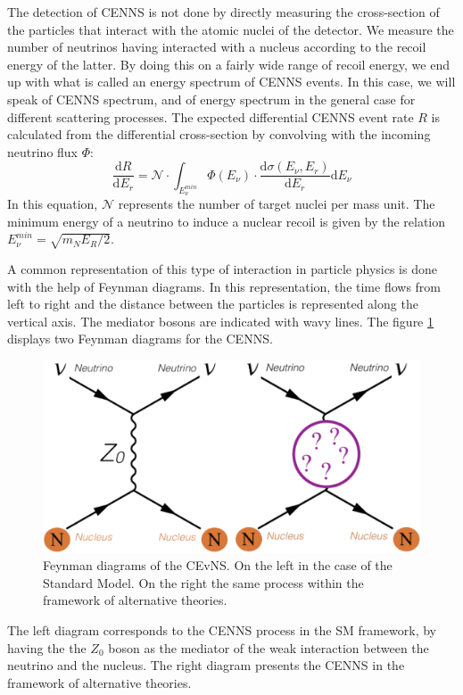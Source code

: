 The detection of CENNS is not done by directly measuring the cross-section of the particles that interact with the atomic nuclei of the detector. We measure the number of neutrinos having interacted with a nucleus according to the recoil energy of the latter. By doing this on a fairly wide range of recoil energy, we end up with what is called an energy spectrum of CENNS events. In this case, we will speak of CENNS spectrum, and of energy spectrum in the general case for different scattering processes. The expected differential CENNS event rate $R$ is calculated from the differential cross-section by convolving with the incoming neutrino flux $\Phi$:
\begin{equation}
\frac{\mathrm{d} R}{\mathrm{d} E_r}
=
\mathcal{N} \cdot
\int_{E_{\nu}^{min}}
\Phi(E_{\nu})
\cdot
\frac{\mathrm{d} \sigma (E_{\nu}, E_r) }{\mathrm{d} E_r} \mathrm{d} E_{\nu}
\end{equation}
In this equation, $\mathcal{N}$ represents the number of target nuclei per mass unit. The minimum energy of a neutrino to induce a nuclear recoil is given by the relation $E_{\nu}^{min}= \sqrt{m_N E_R /2}$.

A common representation of this type of interaction in particle physics is done with the help of Feynman diagrams. In this representation, the time flows from left to right and the distance between the particles is represented along the vertical axis. The mediator bosons are indicated with wavy lines. The figure \ref{fig:cenns-feynman} displays two Feynman diagrams for the CENNS.
\begin{figure}
\centering
\includegraphics [scale=1]{Figures/Introduction/cenns_feynman.png}
\caption{Feynman diagrams of the CEvNS. On the left in the case of the Standard Model. On the right the same process within the framework of alternative theories.}
\label{fig:cenns-feynman}
\end{figure}
The left diagram corresponds to the CENNS process in the SM framework, by having the the $Z_0$ boson as the mediator of the weak interaction between the neutrino and the nucleus. The right diagram presents the CENNS in the framework of alternative theories.


